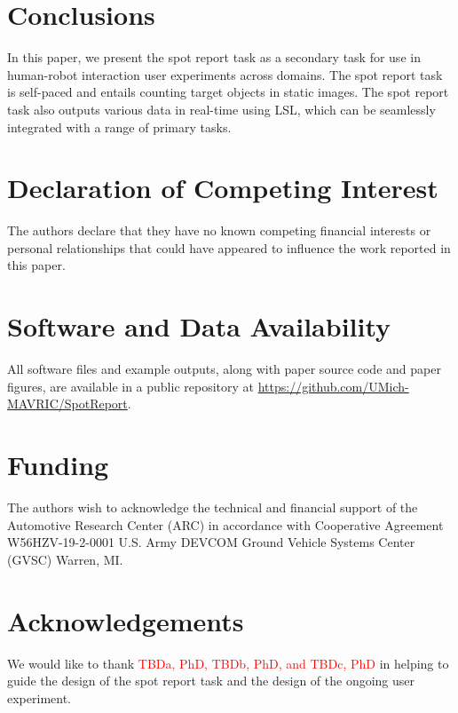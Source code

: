 \documentclass[preprint,12pt, a4paper]{elsarticle}
\begin{document}
\section{Conclusions}
In this paper, we present the spot report task as a secondary task for use in human-robot interaction user experiments across domains. The spot report task is self-paced and entails counting target objects in static images. The spot report task also outputs various data in real-time using LSL, which can be seamlessly integrated with a range of primary tasks.

\section*{Declaration of Competing Interest}
The authors declare that they have no known competing financial interests or personal relationships that could have appeared to influence the work reported in this paper.

\section*{Software and Data Availability}
All software files and example outputs, along with paper source code and paper figures, are available in a public repository at \url{https://github.com/UMich-MAVRIC/SpotReport}. 


\section*{Funding}
The authors wish to acknowledge the technical and financial support of the Automotive Research Center (ARC) in accordance with Cooperative Agreement W56HZV-19-2-0001 U.S. Army DEVCOM Ground Vehicle Systems Center (GVSC) Warren, MI.

\section*{Acknowledgements}
We would like to thank \textcolor{red}{TBDa, PhD, TBDb, PhD, and TBDc, PhD} in helping to guide the design of the spot report task and the design of the ongoing user experiment.
 
\end{document}
